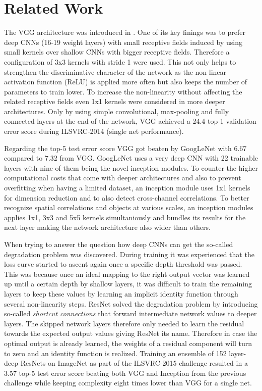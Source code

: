 \section{Related Work} \label{related_work}

The VGG architecture was introduced in \cite{KarenSimonyan.2014}. One of its key finings was to prefer deep CNNs (16-19 weight layers) with small receptive fields induced by using small kernels over shallow CNNs with bigger receptive fields. Therefore a configuration of 3x3 kernels with stride 1 were used. This not only helps to strengthen the discriminative character of the network as the non-linear activation function (ReLU) is applied more often but also keeps the number of parameters to train lower. To increase the non-linearity without affecting the related receptive fields even 1x1 kernels were considered in more deeper architectures. Only by using simple convolutional, max-pooling and fully connected layers at the end of the network, VGG achieved a 24.4 top-1 validation error score during ILSVRC-2014 (single net performance). \cite{KarenSimonyan.2014}

Regarding the top-5 test error score VGG got beaten by GoogLeNet with 6.67 compared to 7.32 from VGG. GoogLeNet uses a very deep CNN with 22 trainable layers with nine of them being the novel inception modules. To counter the higher computational costs that come with deeper architectures and also to prevent overfitting when having a limited dataset, an inception module uses 1x1 kernels for dimension reduction and to also detect cross-channel correlations. To better recognize spatial correlations and objects at various scales, an inception modules applies 1x1, 3x3 and 5x5 kernels simultaniously and bundles its results for the next layer making the network architecture also wider than others. \cite{ChristianSzegedy.2014}

When trying to answer the question how deep CNNs can get the so-called degradation problem was discovered. During training it was experienced that the loss curve started to ascent again once a specific depth threshold was passed. This was because once an ideal mapping to the right output vector was learned up until a certain depth by shallow layers, it was difficult to train the remaining layers to keep these values by learning an implicit identity function through several non-linearity steps. ResNet solved the degradation problem by introducing so-called \textit{shortcut connections} that forward intermediate network values to deeper layers. The skipped network layers therefore only needed to learn the residual towards the expected output values giving ResNet its name. Therefore in case the optimal output is already learned, the weights of a residual component will turn to zero and an identity function is realized. Training an ensemble of 152 layer-deep ResNets on ImageNet as part of the ILSVRC-2015 challenge resulted in a 3.57 top-5 test error score beating both VGG and Inception from the previous challenge while keeping complexity eight times lower than VGG for a single net. \cite{KaimingHe.2015}

